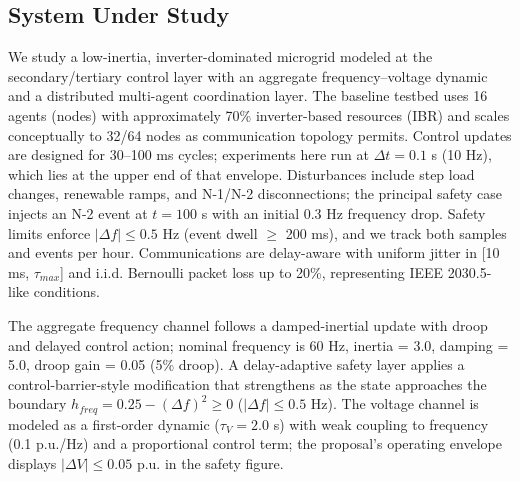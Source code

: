 \documentclass[12pt]{article}
\begin{document}
\vspace{-0.5cm}
\subsection{System Under Study}
\vspace{-0.2cm}
We study a low-inertia, inverter-dominated microgrid modeled at the secondary/tertiary control layer with an aggregate frequency--voltage dynamic and a distributed multi-agent coordination layer. The baseline testbed uses 16 agents (nodes) with approximately 70\% inverter-based resources (IBR) and scales conceptually to 32/64 nodes as communication topology permits. Control updates are designed for 30--100 ms cycles; experiments here run at $\Delta t = 0.1$ s (10 Hz), which lies at the upper end of that envelope. Disturbances include step load changes, renewable ramps, and N-1/N-2 disconnections; the principal safety case injects an N-2 event at $t = 100$ s with an initial 0.3 Hz frequency drop. Safety limits enforce $|\Delta f| \leq 0.5$ Hz (event dwell $\geq$ 200 ms), and we track both samples and events per hour. Communications are delay-aware with uniform jitter in [10 ms, $\tau_{max}$] and i.i.d. Bernoulli packet loss up to 20\%, representing IEEE 2030.5-like conditions.

The aggregate frequency channel follows a damped-inertial update with droop and delayed control action; nominal frequency is 60 Hz, inertia = 3.0, damping = 5.0, droop gain = 0.05 (5\% droop). A delay-adaptive safety layer applies a control-barrier-style modification that strengthens as the state approaches the boundary $h_{freq} = 0.25 - (\Delta f)^2 \geq 0$ ($|\Delta f| \leq 0.5$ Hz). The voltage channel is modeled as a first-order dynamic ($\tau_V = 2.0$ s) with weak coupling to frequency (0.1 p.u./Hz) and a proportional control term; the proposal's operating envelope displays $|\Delta V| \leq 0.05$ p.u. in the safety figure.
\end{document}
